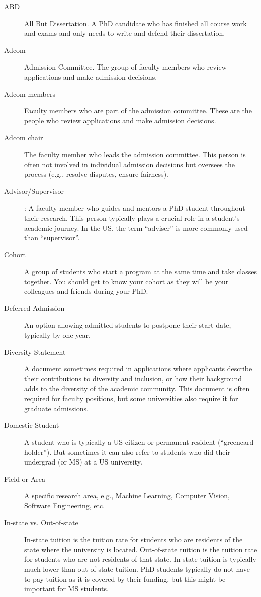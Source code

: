 \documentclass[oneside,11pt,dvipsnames]{book}
\begin{document}
\begin{description}

  \item[ABD] All But Dissertation. A PhD candidate who has finished all course work and exams and only needs to write and defend their dissertation.

  \item[Adcom] Admission Committee. The group of faculty members who review applications and make admission decisions.
  \item [Adcom members] Faculty members who are part of the admission committee. These are the people who review applications and make admission decisions.
  \item[Adcom chair] The faculty member who leads the admission committee. This person is often not involved in individual admission decisions but oversees the process (e.g., resolve disputes, ensure fairness).
  \item[Advisor/Supervisor]: A faculty member who guides and mentors a PhD student throughout their research. This person typically plays a crucial role in a student's academic journey. In the US, the term ``adviser'' is more commonly used than ``supervisor''.
  \item[Cohort] A group of students who start a program at the same time and take classes together. You should get to know your cohort as they will be your colleagues and friends during your PhD.
  \item  [Deferred Admission] An option allowing admitted students to postpone their start date, typically by one year.
  \item [Diversity Statement] A document sometimes required in applications where applicants describe their contributions to diversity and inclusion, or how their background adds to the diversity of the academic community. This document is often required for faculty positions, but some universities also require it for graduate admissions.
  \item[Domestic Student] A student who is typically a US citizen or permanent resident (``greencard holder'').
        But sometimes it can also refer to students who did their undergrad (or MS) at a US university.
  \item[Field or Area] A specific research area, e.g., Machine Learning, Computer Vision, Software Engineering, etc.
  \item [In-state vs. Out-of-state] In-state tuition is the tuition rate for students who are residents of the state where the university is located. Out-of-state tuition is the tuition rate for students who are not residents of that state. In-state tuition is typically much lower than out-of-state tuition. PhD students typically do not have to pay tuition as it is covered by their funding, but this might be important for MS students.

\end{description}
\end{document}
